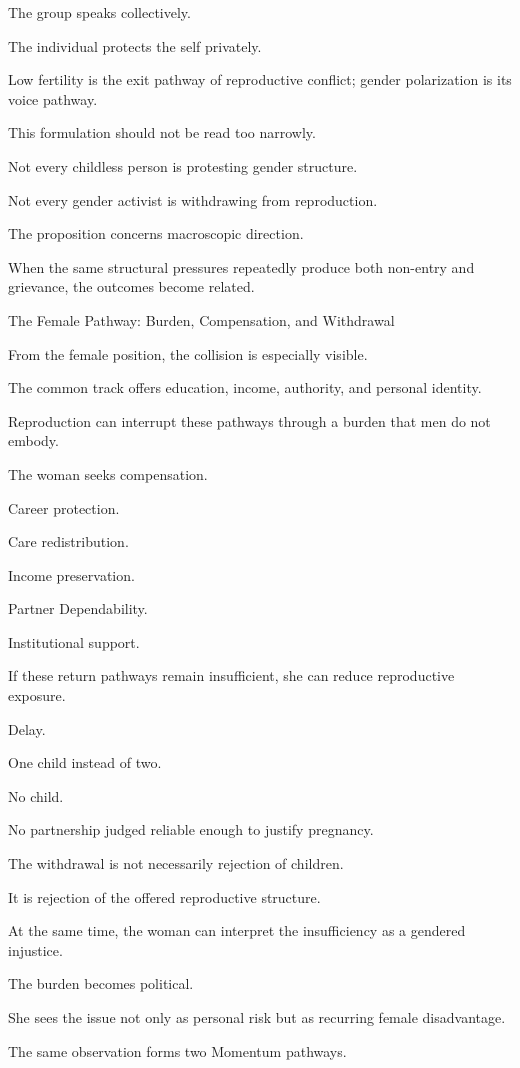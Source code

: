The group speaks collectively.

The individual protects the self privately.

Low fertility is the exit pathway of reproductive conflict; gender polarization is its voice pathway.

This formulation should not be read too narrowly.

Not every childless person is protesting gender structure.

Not every gender activist is withdrawing from reproduction.

The proposition concerns macroscopic direction.

When the same structural pressures repeatedly produce both non-entry and grievance, the outcomes become related.

The Female Pathway: Burden, Compensation, and Withdrawal

From the female position, the collision is especially visible.

The common track offers education, income, authority, and personal identity.

Reproduction can interrupt these pathways through a burden that men do not embody.

The woman seeks compensation.

Career protection.

Care redistribution.

Income preservation.

Partner Dependability.

Institutional support.

If these return pathways remain insufficient, she can reduce reproductive exposure.

Delay.

One child instead of two.

No child.

No partnership judged reliable enough to justify pregnancy.

The withdrawal is not necessarily rejection of children.

It is rejection of the offered reproductive structure.

At the same time, the woman can interpret the insufficiency as a gendered injustice.

The burden becomes political.

She sees the issue not only as personal risk but as recurring female disadvantage.

The same observation forms two Momentum pathways.


